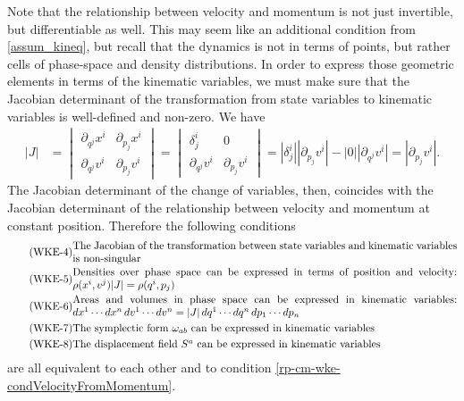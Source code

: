 Note that the relationship between velocity and momentum is not just invertible, but differentiable as well. This may seem like an additional condition from \ref{assum_kineq}, but recall that the dynamics is not in terms of points, but rather cells of phase-space and density distributions. In order to express those geometric elements in terms of the kinematic variables, we must make sure that the Jacobian determinant of the transformation from state variables to kinematic variables is well-defined and non-zero. We have
\begin{equation}
	\begin{aligned}
		|J| &= \begin{vmatrix}
			\partial_{q^j} x^i & \partial_{p_j} x^i  \\
			\partial_{q^j} v^i & \partial_{p_j} v^i
		\end{vmatrix}
		= \begin{vmatrix}
			\delta^i_j & 0 \\
			\partial_{q^j} v^i & \partial_{p_j} v^i
		\end{vmatrix} 
		= \left|\delta^i_j\right| \left|\partial_{p_j} v^i\right| - |0| \left|\partial_{q^j} v^i\right| = \left|\partial_{p_j} v^i\right|.
	\end{aligned}
\end{equation}
The Jacobian determinant of the change of variables, then, coincides with the Jacobian determinant of the relationship between velocity and momentum at constant position. Therefore the following conditions
\begin{align}
	\tag{WKE-4}\label{rp-cm-wke-condJacobianNonSingular}
	&\parbox{5in}{The Jacobian of the transformation between state variables and kinematic variables is non-singular} \\
	\tag{WKE-5}\label{rp-cm-wke-condDensities}
	&\parbox{5in}{Densities over phase space can be expressed in terms of position and velocity: $\rho(x^i, v^j) |J| = \rho(q^i, p_j)$} \\
	\tag{WKE-6}\label{rp-cm-wke-condAreas}
	&\parbox{5in}{Areas and volumes in phase space can be expressed in kinematic variables: $dx^1 \cdots dx^n \, dv^1 \cdots dv^n = |J| \, dq^1 \cdots dq^n \, dp_1 \cdots dp_n$} \\
	\tag{WKE-7}\label{rp-cm-wke-condSymplectic}
	&\parbox{5in}{The symplectic form $\omega_{ab}$ can be expressed in kinematic variables} \\
	\tag{WKE-8}\label{rp-cm-wke-condDisplacement}
	&\parbox{5in}{The displacement field $S^a$ can be expressed in kinematic variables}
\end{align}
are all equivalent to each other and to condition \ref{rp-cm-wke-condVelocityFromMomentum}.

